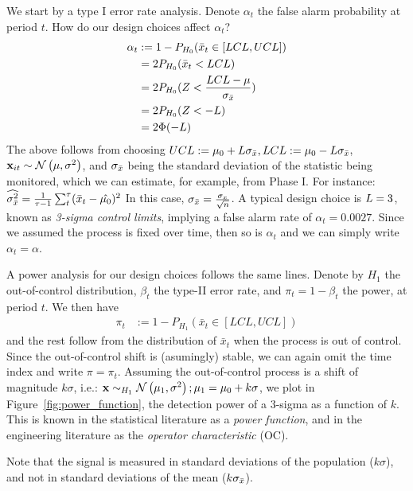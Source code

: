 We start by a type I error rate analysis. 
Denote $\alpha_t$ the false alarm probability at period $t$.
How do our design choices affect $\alpha_t$?
\begin{align}
	\alpha_t &:= 1-P_{H_0}(\bar{x}_t \in [LCL,UCL]) \\
	&= 2 P_{H_0}(\bar{x}_t < LCL) \\
	&= 2 P_{H_0}(Z<\frac{LCL-\mu}{\sigma_{\bar{x}}}) \\
	&= 2 P_{H_0}(Z < -L) \\
	&= 2 \Phi(-L)
\end{align}
The above follows from choosing $UCL:=\mu_0 + L \sigma_{\bar{x}}, LCL:= \mu_0 - L \sigma_{\bar{x}}$, $\mathbf{x}_{it}\sim \mathcal{N}\left(\mu,\sigma^2\right)$, and $\sigma_{\bar{x}}$ being the standard deviation of the statistic being monitored, which we can estimate, for example, from Phase I. 
For instance: 
$\widehat{\sigma_{\bar{x}}^2}=\frac{1}{\tau-1} \sum_t^\tau (\bar{x}_t- \hat{\mu_0})^2 $
In this case, $\sigma_{\bar{x}}=\frac{\sigma_x}{\sqrt{n}}$.
A typical design choice is $L=3$, known as \emph{3-sigma control limits}, implying a false alarm rate of $\alpha_t=0.0027$.
Since we assumed the process is fixed over time, then so is $\alpha_t$ and we can simply write $\alpha_t=\alpha$.

A power analysis for our design choices follows the same lines.
Denote by $H_1$ the out-of-control distribution,  $\beta_t$ the type-II error rate, and $\pi_t=1-\beta_t$ the power, at period $t$.
We then have
\begin{align}
	\pi_t &:= 1-P_{H_1}(\bar{x}_t \in [LCL,UCL])
\end{align}
and the rest follow from the distribution of $\bar{x}_t$ when the process is out of control.
Since the out-of-control shift is (asumingly) stable, we can again omit the time index and write $\pi=\pi_t$.
Assuming the out-of-control process is a shift of magnitude $k \sigma$, i.e.: 
$\mathbf{x} \sim_{H_1} \mathcal{N}\left(\mu_1,\sigma^2\right); \mu_1=\mu_0+ k \sigma$, we plot in Figure~\ref{fig:power_function}, the detection power of a 3-sigma \barxChart as a function of $k$. 
This is known in the statistical literature as a \emph{power function}, and in the engineering literature as the \emph{operator characteristic} (OC).

\begin{remark}
	Note that the signal is measured in standard deviations of the population ($k \sigma$), and not in standard deviations of the mean ($k \sigma_{\bar{x}}$).
\end{remark}


